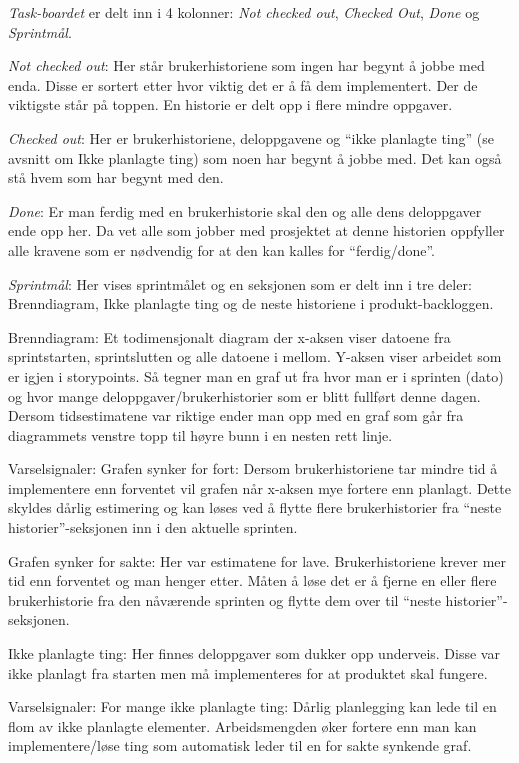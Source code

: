 \documentclass[12pt,a4paper,norsk]{article}
\begin{document}
    \textit{Task-boardet} er delt inn i 4 kolonner: \textit{Not checked out}, \textit{Checked Out}, \textit{Done} og \textit{Sprintmål}.
    
    \textit{Not checked out}: Her står brukerhistoriene som ingen har begynt å jobbe med enda. Disse er sortert etter hvor viktig det er å få dem implementert. Der de viktigste står på toppen. En historie er delt opp i flere mindre oppgaver.

    \textit{Checked out}: Her er brukerhistoriene, deloppgavene og “ikke planlagte ting” (se avsnitt om Ikke planlagte ting) som noen har begynt å jobbe med. Det kan også stå hvem som har begynt med den.

    \textit{Done}: Er man ferdig med en brukerhistorie skal den og alle dens deloppgaver ende opp her. Da vet alle som jobber med prosjektet at denne historien oppfyller alle kravene som er nødvendig for at den kan kalles for “ferdig/done”.
	
    \textit{Sprintmål}: Her vises sprintmålet og en seksjonen som er delt inn i tre deler: Brenndiagram, Ikke planlagte ting og de neste historiene i produkt-backloggen.

    Brenndiagram:
    Et todimensjonalt diagram der x-aksen viser datoene fra sprintstarten, sprintslutten og alle datoene i mellom. Y-aksen viser arbeidet som er igjen i storypoints. Så tegner man en graf ut fra hvor man er i sprinten (dato) og hvor mange deloppgaver/brukerhistorier som er blitt fullført denne dagen. Dersom tidsestimatene var riktige ender man opp med en graf som går fra diagrammets venstre topp til høyre bunn i en nesten rett linje.

    Varselsignaler:
	Grafen synker for fort:
    Dersom brukerhistoriene tar mindre tid å implementere enn forventet vil grafen når x-aksen mye fortere enn planlagt. Dette skyldes dårlig estimering og kan løses ved å flytte flere brukerhistorier fra “neste historier”-seksjonen inn i den aktuelle sprinten.

	Grafen synker for sakte:
    Her var estimatene for lave. Brukerhistoriene krever mer tid enn forventet og man henger etter. Måten å løse det er å fjerne en eller flere brukerhistorie fra den nåværende sprinten og flytte dem over til “neste historier”-seksjonen.

    Ikke planlagte ting:
    Her finnes deloppgaver som dukker opp underveis. Disse var ikke planlagt fra starten men må implementeres for at produktet skal fungere.

    Varselsignaler:
	For mange ikke planlagte ting:
    Dårlig planlegging kan lede til en flom av ikke planlagte elementer. Arbeidsmengden øker fortere enn man kan implementere/løse ting som automatisk leder til en for sakte synkende graf.
\end{document}
